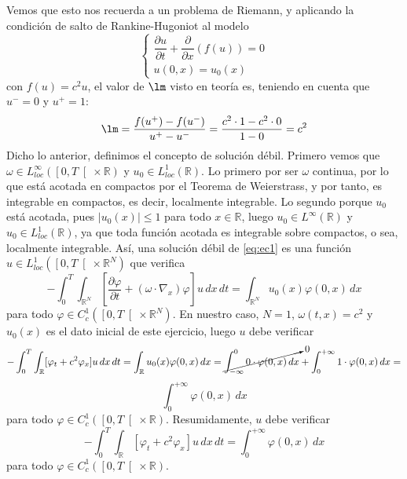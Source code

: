 \documentclass[12pt]{article}
\newcommand{\R}{\mathbb{R}}
\begin{document}
\begin{ejercicio}
        Vemos que esto nos recuerda a un problema de Riemann, y aplicando la condición de salto de Rankine-Hugoniot al modelo 
        \begin{equation*}
            \begin{cases}
                \dfrac{\partial u}{\partial t} + \dfrac{\partial}{\partial x}(f(u)) = 0 \\
                u(0,x) = u_0(x)
            \end{cases}
        \end{equation*}
        con $f(u) = c^2u$, el valor de $\lm$ visto en teoría es, teniendo en cuenta que $u^{-} = 0$ y $u^{+} = 1$:
        $$\lm = \dfrac{f(u^{+}) - f(u^{-})}{u^{+} - u^{-}} = \dfrac{c^2\cdot1-c^2\cdot0}{1-0} = c^2$$
        Dicho lo anterior, definimos el concepto de solución débil. Primero vemos que $\omega \in L^\infty_{loc}(\left[0, T \right[ \times \R)$ y $u_0 \in L_{loc}^1(\R)$. Lo primero 
        por ser $\omega$ continua, por lo que está acotada en compactos por el Teorema de Weierstrass, y por tanto,
        es integrable en compactos, es decir, localmente integrable. Lo segundo porque $u_0$ está acotada, pues $|u_0(x)| \leq 1$ para todo $x \in \R$, luego $u_0 \in L^{\infty}(\R)$ y $u_0 \in L^1_{loc}(\R)$, ya que toda función acotada es integrable sobre compactos, o sea, localmente integrable. 
        Así, una solución débil de \eqref{eq:ec1} es una función $u \in L^1_{loc}(\left[0, T \right[ \times \R^N)$ que verifica 
        $$- \int_{0}^{T} \int_{\R^N} \left[ \dfrac{\partial \varphi}{\partial t} + (\omega \cdot \nabla_x) \varphi \right] u \,dx\,dt = \int_{\R^N} u_0(x) \varphi(0,x)\,dx$$ 
        para todo $\varphi \in C_c^1(\left[0,T \right[ \times \R^N)$. En nuestro caso, $N=1$, $\omega(t,x) = c^2$ y $u_0(x)$ es el dato inicial de este ejercicio, luego $u$ debe verificar 
        $$-\int_0^T\int_{\R} [\varphi_t+c^2\varphi_x]u\,dx\,dt =\int_{\R}u_0(x)\varphi(0,x)\,dx =\cancelto{0}{\int_{-\infty}^0 0\cdot\varphi(0,x)\,dx} + \int_0^{+\infty}1\cdot\varphi(0,x)\,dx = $$
        $$\int_0^{+\infty}\varphi(0,x)\,dx$$
        para todo $\varphi \in C_c^1(\left[0,T \right[ \times \R)$. Resumidamente, $u$ debe verificar
        $$-\int_0^T\int_{\R} [\varphi_t+c^2\varphi_x]u\,dx\,dt = \int_0^{+\infty}\varphi(0,x)\,dx$$
        para todo $\varphi \in C_c^1(\left[0,T \right[ \times \R)$.
    \end{ejercicio}
\end{document}
